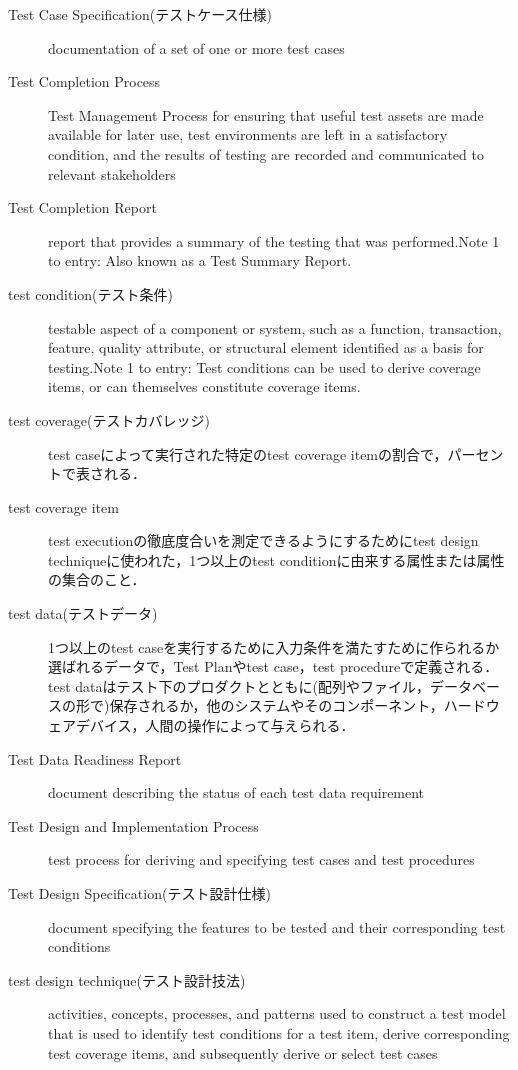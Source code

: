\begin{description}
    \item[Test Case Specification(テストケース仕様)]documentation of a set of one or more test cases
    \item[Test Completion Process]Test Management Process for ensuring that useful test assets are made available for later use, test environments are left in a satisfactory condition, and the results of testing are recorded and communicated to relevant stakeholders
    \item[Test Completion Report]report that provides a summary of the testing that was performed.Note 1 to entry: Also known as a Test Summary Report.
    \item[test condition(テスト条件)]testable aspect of a component or system, such as a function, transaction, feature, quality attribute, or structural element identified as a basis for testing.Note 1 to entry: Test conditions can be used to derive coverage items, or can themselves constitute coverage items.
    \item[test coverage(テストカバレッジ)]test caseによって実行された特定のtest coverage itemの割合で，パーセントで表される．
    \item[test coverage item]test executionの徹底度合いを測定できるようにするためにtest design techniqueに使われた，1つ以上のtest conditionに由来する属性または属性の集合のこと．
    \item[test data(テストデータ)]1つ以上のtest caseを実行するために入力条件を満たすために作られるか選ばれるデータで，Test Planやtest case，test procedureで定義される．test dataはテスト下のプロダクトとともに(配列やファイル，データベースの形で)保存されるか，他のシステムやそのコンポーネント，ハードウェアデバイス，人間の操作によって与えられる．
    \item[Test Data Readiness Report]document describing the status of each test data requirement
    \item[Test Design and Implementation Process]test process for deriving and specifying test cases and test procedures
    \item[Test Design Specification(テスト設計仕様)]document specifying the features to be tested and their corresponding test conditions
    \item[test design technique(テスト設計技法)]activities, concepts, processes, and patterns used to construct a test model that is used to identify test conditions for a test item, derive corresponding test coverage items, and subsequently derive or select test cases

\end{description}
